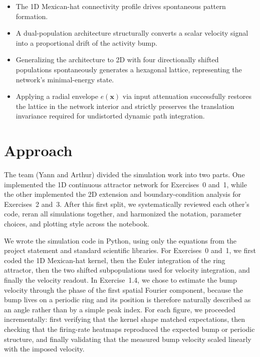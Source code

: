\documentclass[10pt, a4paper]{article}
\begin{document}
\begin{itemize}[itemsep=0pt, parsep=0pt, topsep=2pt, partopsep=0pt]
    \item The 1D Mexican-hat connectivity profile drives spontaneous pattern formation.
    \item A dual-population architecture structurally converts a scalar velocity signal into a proportional drift of the activity bump.
    \item Generalizing the architecture to 2D with four directionally shifted populations spontaneously generates a hexagonal lattice, representing the network's minimal-energy state.
    \item Applying a radial envelope $e(\mathbf{x})$ via input attenuation successfully restores the lattice in the network interior and strictly preserves the translation invariance required for undistorted dynamic path integration.
\end{itemize}


\section{Approach}
The team (Yann and Arthur) divided the simulation work into two parts. One implemented the 1D continuous attractor network for Exercises~0 and~1, while the other implemented the 2D extension and boundary-condition analysis for Exercises~2 and~3. After this first split, we systematically reviewed each other's code, reran all simulations together, and harmonized the notation, parameter choices, and plotting style across the notebook.

We wrote the simulation code in Python, using only the equations from the project statement and standard scientific libraries. For Exercises~0 and~1, we first coded the 1D Mexican-hat kernel, then the Euler integration of the ring attractor, then the two shifted subpopulations used for velocity integration, and finally the velocity readout. In Exercise~1.4, we chose to estimate the bump velocity through the phase of the first spatial Fourier component, because the bump lives on a periodic ring and its position is therefore naturally described as an angle rather than by a simple peak index. For each figure, we proceeded incrementally: first verifying that the kernel shape matched expectations, then checking that the firing-rate heatmaps reproduced the expected bump or periodic structure, and finally validating that the measured bump velocity scaled linearly with the imposed velocity.
\end{document}
